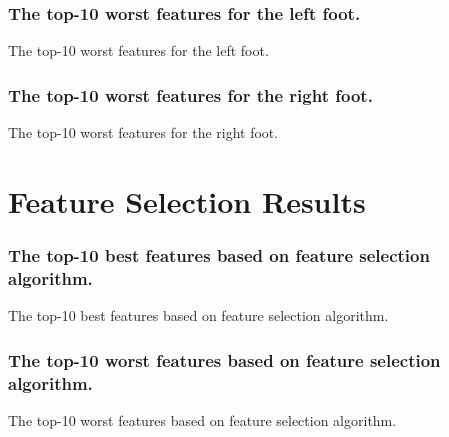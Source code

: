 \documentclass{beamer}
\begin{document}
\begin{frame}[shrink=10]
\frametitle{The top-10 worst features for the left foot.}
\tiny
\begin{table}
\centering
\caption{\small The top-10 worst features for the left foot.}

\end{table}
\end{frame}

\begin{frame}[shrink=10]
\frametitle{The top-10 worst features for the right foot.}
\tiny
\begin{table}
\centering
\caption{\small The top-10 worst features for the right foot.}

\end{table}
\end{frame}


\section{Feature Selection Results}
\begin{frame}[shrink=10]
\frametitle{The top-10 best features based on feature selection algorithm.}
\tiny
\begin{table}
\centering
\caption{\small The top-10 best features based on feature selection algorithm.}

\end{table}
\end{frame}

\begin{frame}[shrink=10]
\frametitle{The top-10 worst features based on feature selection algorithm.}
\tiny
\begin{table}
\centering
\caption{\small The top-10 worst features based on feature selection algorithm.}

\end{table}
\end{frame}
\end{document}
